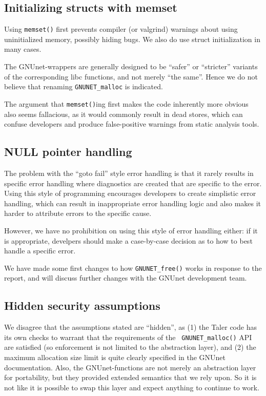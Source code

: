 \documentclass[11pt]{article}
\begin{document}
\subsection{Initializing structs with memset}

Using {\tt memset()} first prevents compiler (or valgrind) warnings about
using uninitialized memory, possibly hiding bugs. We also do use struct
initialization in many cases.

The GNUnet-wrappers are generally designed to be ``safer'' or ``stricter''
variants of the corresponding libc functions, and not merely ``the same''.
Hence we do not believe that renaming {\tt GNUNET\_malloc} is indicated.

The argument that {\tt memset()}ing first makes the code inherently more
obvious also seems fallacious, as it would commonly result in dead stores,
which can confuse developers and produce false-positive warnings from static
analysis tools.

\subsection{NULL pointer handling}

The problem with the ``goto fail'' style error handling is that it rarely
results in specific error handling where diagnostics are created that are
specific to the error. Using this style of programming encourages developers
to create simplistic error handling, which can result in inappropriate error
handling logic and also makes it harder to attribute errors to the specific
cause.

However, we have no prohibition on using this style of error handling either:
if it is appropriate, develpers should make a case-by-case decision as to how
to best handle a specific error.

We have made some first changes to how {\tt GNUNET\_free()} works in response
to the report, and will discuss further changes with the GNUnet development
team.

\subsection{Hidden security assumptions}

We disagree that the assumptions stated are ``hidden'', as (1) the Taler code
has its own checks to warrant that the requirements of the {\tt
  GNUNET\_malloc()} API are satisfied (so enforcement is not limited to the
abstraction layer), and (2) the maximum allocation size limit is quite clearly
specified in the GNUnet documentation.  Also, the GNUnet-functions are not
merely an abstraction layer for portability, but they provided extended
semantics that we rely upon. So it is not like it is possible to swap this
layer and expect anything to continue to work.
\end{document}
